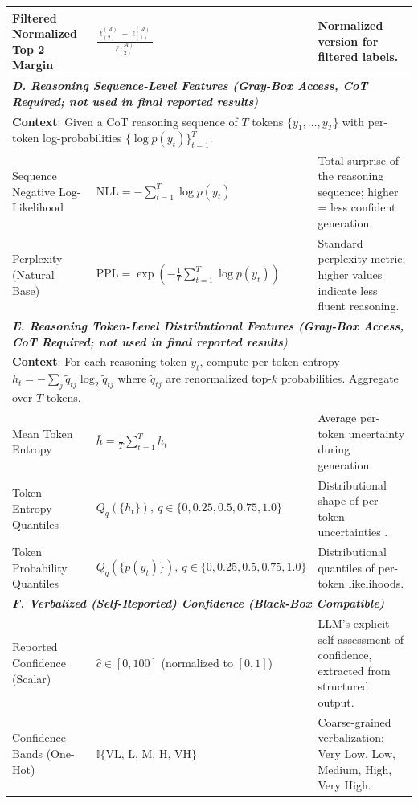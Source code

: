 \begin{table}[t]
\begin{tabular}{p{4.0cm} p{4.8cm} p{8.2cm}}
Filtered Normalized Top 2 Margin & $\frac{\ell^{(\mathcal{A})}_{(2)} - \ell^{(\mathcal{A})}_{(1)}}{\ell^{(\mathcal{A})}_{(2)}}$ & Normalized version for filtered labels. \\
\midrule
\multicolumn{3}{l}{\textit{\textbf{D. Reasoning Sequence-Level Features (Gray-Box Access, CoT Required; not used in final reported results})}} \\
\multicolumn{3}{p{17.0cm}}{\small \textbf{Context}: Given a CoT reasoning sequence of $T$ tokens $\{y_1, \ldots, y_T\}$ with per-token log-probabilities $\{\log p(y_t)\}_{t=1}^T$.} \\[0.5ex]
\hdashline
Sequence Negative Log-Likelihood & $\text{NLL} = -\sum_{t=1}^{T} \log p(y_t)$ & Total surprise of the reasoning sequence; higher = less confident generation. \\
Perplexity (Natural Base) & $\text{PPL} = \exp\!\left(-\frac{1}{T} \sum_{t=1}^{T} \log p(y_t)\right)$ & Standard perplexity metric; higher values indicate less fluent reasoning. \\
\midrule
\multicolumn{3}{l}{\textit{\textbf{E. Reasoning Token-Level Distributional Features (Gray-Box Access, CoT Required; not used in final reported results})}} \\
\multicolumn{3}{p{17.0cm}}{\small \textbf{Context}: For each reasoning token $y_t$, compute per-token entropy $h_t = -\sum_j \tilde{q}_{tj} \log_2 \tilde{q}_{tj}$ where $\tilde{q}_{tj}$ are renormalized top-$k$ probabilities. Aggregate over $T$ tokens.} \\[0.5ex]
\hdashline
Mean Token Entropy & $\bar{h} = \frac{1}{T} \sum_{t=1}^T h_t$ & Average per-token uncertainty during generation. \\
Token Entropy Quantiles & $Q_q(\{h_t\}),\ q \in \{0, 0.25, 0.5, 0.75, 1.0\}$ & Distributional shape of per-token uncertainties . \\
Token Probability Quantiles & $Q_q(\{p(y_t)\}),\ q \in \{0, 0.25, 0.5, 0.75, 1.0\}$ & Distributional quantiles of per-token likelihoods. \\
\midrule
\multicolumn{3}{l}{\textit{\textbf{F. Verbalized (Self-Reported) Confidence (Black-Box Compatible)}}} \\
\hdashline
Reported Confidence (Scalar) & $\hat{c} \in [0, 100]$ (normalized to $[0,1]$) & LLM's explicit self-assessment of confidence, extracted from structured output. \\
Confidence Bands (One-Hot) & $\mathbb{I}\{\text{VL, L, M, H, VH}\}$ & Coarse-grained verbalization: Very Low, Low, Medium, High, Very High.\\

\end{tabular}
\end{table}
